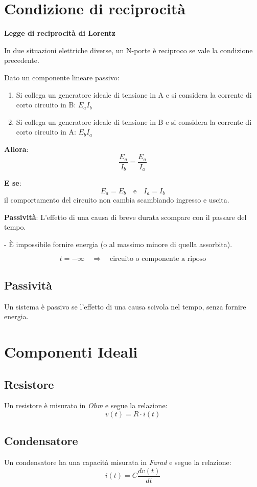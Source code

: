 \section*{Condizione di reciprocità}

\textbf{Legge di reciprocità di Lorentz}

In due situazioni elettriche diverse, un N-porte è reciproco se vale la condizione precedente.

Dato un componente lineare passivo:

\begin{enumerate}
    \item Si collega un generatore ideale di tensione in A e si considera la corrente di corto circuito in B: \( E_a I_b \)
    \item Si collega un generatore ideale di tensione in B e si considera la corrente di corto circuito in A: \( E_b I_a \)
\end{enumerate}

\textbf{Allora}: 
\[
\frac{E_a}{I_b} = \frac{E_a}{I_a}
\]

\textbf{E se}: 
\[
E_a = E_b \quad \text{e} \quad I_a = I_b 
\]
il comportamento del circuito non cambia scambiando ingresso e uscita.

\textbf{Passività}: L’effetto di una causa di breve durata scompare con il passare del tempo.

- È impossibile fornire energia (o al massimo minore di quella assorbita).

\[
t = -\infty \quad \Rightarrow \quad \text{circuito o componente a riposo}
\]

\subsection*{Passività}
Un sistema è passivo se l'effetto di una causa scivola nel tempo, senza fornire energia.

\section{Componenti Ideali}

\subsection*{Resistore}
Un resistore è misurato in \textit{Ohm} e segue la relazione:
\[
v(t) = R \cdot i(t)
\]

\subsection*{Condensatore}
Un condensatore ha una capacità misurata in \textit{Farad} e segue la relazione:
\[
i(t) = C \frac{d v(t)}{dt}
\]

